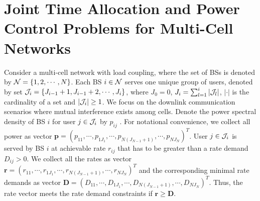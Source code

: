 \documentclass[journal]{IEEEtran}
\begin{document}
\section{Joint Time Allocation and Power Control Problems for Multi-Cell Networks}
Consider a multi-cell network with load coupling, where the set of BSs is denoted by ${\cal{N}}=\{1, 2, \cdots, N\}$.
Each BS $i \in {\cal{N}}$ serves one unique group of users, denoted by set
${\cal{J}}_i=\{J_{i-1}+1,J_{i-1}+2,\cdots, J_{i}\}$, where $J_0=0$, $J_i=\sum_{l=1}^i|{\cal{J}}_l|$, $|\cdot|$ is the cardinality of a set and $|{\cal{J}}_i|\geq 1$.
We focus on the
downlink communication scenarios where mutual interference exists among cells.
Denote the power spectral density of BS $i$ for user $j \in {\cal{J}}_i$ by $p_{ij}$ \cite{Siomin2012Analysis,siomina2013optimization,Chin2015Power}.
For notational convenience, we collect all power as vector
$\pmb{p}=(p_{11}, \cdots, p_{1J_1}, \cdots, p_{N(J_{N-1}+1)}, \cdots, p_{NJ_N})^T$.
User $j \in {\cal{J}}_i$ is served by BS $i$ at achievable rate $r_{ij}$ that has to be greater than a rate demand $D_{ij}>0$.
We collect all the rates as vector $\pmb{r}=(r_{11}, \cdots, r_{1J_1}, \cdots, r_{N(J_{N-1}+1)}, \cdots, r_{NJ_N})^T$ and the corresponding minimal rate demands as vector $\pmb{D}=(D_{11}, \cdots, D_{1J_1}, \cdots, D_{N(J_{N-1}+1)}, \cdots, D_{NJ_N})^T$.
Thus, the rate vector meets the rate demand constraints if $\pmb{r} \geq \pmb{D}$.
\end{document}
